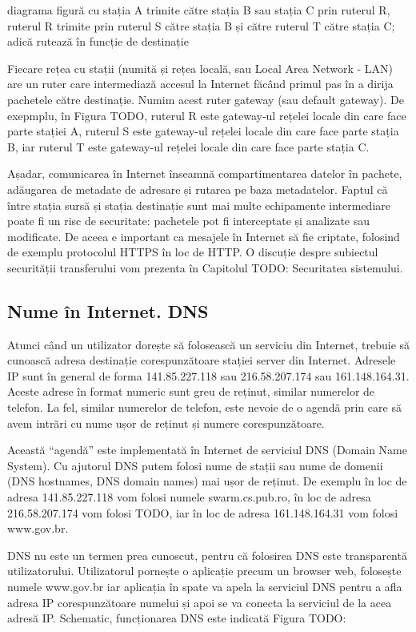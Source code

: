 diagrama figură cu stația A trimite către stația B sau stația C prin ruterul R, ruterul R trimite prin ruterul S către stația B și către ruterul T către stația C; adică rutează în funcție de destinație

Fiecare rețea cu stații (numită și rețea locală, sau Local Area Network - LAN) are un ruter care intermediază accesul la Internet făcând primul pas în a dirija pachetele către destinație. Numim acest ruter gateway (sau default gateway). De exepmplu, în Figura TODO, ruterul R este gateway-ul rețelei locale din care face parte stației A, ruterul S este gateway-ul rețelei locale din care face parte stația B, iar ruterul T este gateway-ul rețelei locale din care face parte stația C.

Așadar, comunicarea în Internet înseamnă compartimentarea datelor în pachete, adăugarea de metadate de adresare și rutarea pe baza metadatelor. Faptul că între stația sursă și stația destinație sunt mai multe echipamente intermediare poate fi un risc de securitate: pachetele pot fi interceptate și analizate sau modificate. De aceea e important ca mesajele în Internet să fie criptate, folosind de exemplu protocolul HTTPS în loc de HTTP. O discuție despre subiectul securității transferului vom prezenta în Capitolul TODO: Securitatea sistemului.

\subsection{Nume în Internet. DNS}
\label{sec:net:dns}

Atunci când un utilizator dorește să folosească un serviciu din Internet, trebuie să cunoască adresa destinație corespunzătoare stației server din Internet. Adresele IP sunt în general de forma 141.85.227.118 sau 216.58.207.174 sau 161.148.164.31. Aceste adrese în format numeric sunt greu de reținut, similar numerelor de telefon. La fel, similar numerelor de telefon, este nevoie de o agendă prin care să avem intrări cu nume ușor de reținut și numere corespunzătoare.

Această “agendă” este implementată în Internet de serviciul DNS (Domain Name System). Cu ajutorul DNS putem folosi nume de stații sau nume de domenii (DNS hostnames, DNS domain names) mai ușor de reținut. De exemplu în loc de adresa 141.85.227.118 vom folosi numele swarm.cs.pub.ro, în loc de adresa 216.58.207.174 vom folosi TODO, iar în loc de adresa 161.148.164.31 vom folosi www.gov.br.

DNS nu este un termen prea cunoscut, pentru că folosirea DNS este transparentă utilizatorului. Utilizatorul pornește o aplicație precum un browser web, folosește numele www.gov.br iar aplicația în spate va apela la serviciul DNS pentru a afla adresa IP corespunzătoare numelui și apoi se va conecta la serviciul de la acea adresă IP. Schematic, funcționarea DNS este indicată Figura TODO:

